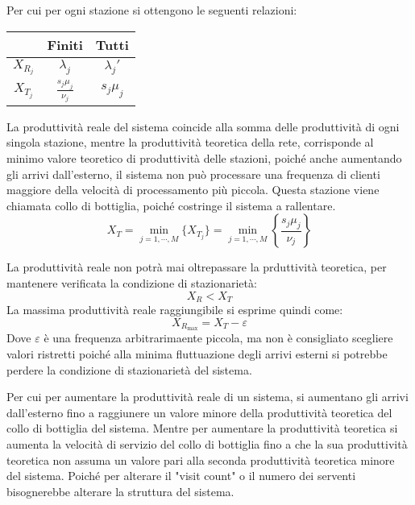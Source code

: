 \documentclass{article}
\numberwithin{equation}{subsection}
\begin{document}
Per cui per ogni stazione si ottengono le seguenti relazioni:
\begin{center}
    \begin{tabular}{c|c|c|}
        & Finiti & Tutti\\
        \hline
        $X_{R_j}$ & $\lambda_j$ & $\lambda_j'$\\
        \hline
        $X_{T_j}$ & $\frac{s_j\mu_j}{\nu_j}$ & $s_j\mu_j$\\
        \hline
    \end{tabular}
\end{center}
La produttività reale del sistema coincide alla somma delle produttività di ogni singola stazione, mentre la produttività teoretica della rete, corrisponde al minimo valore 
teoretico di produttività delle stazioni, poiché anche aumentando gli arrivi dall'esterno, il sistema non può processare una frequenza di clienti maggiore della 
velocità di processamento più piccola. Questa stazione viene chiamata collo di bottiglia, poiché costringe il sistema a rallentare. 
\begin{equation}
    X_T=\min_{j=1,\cdots,M}\{X_{T_j}\}=\min_{j=1,\cdots,M}\left\{\displaystyle\frac{s_j\mu_j}{\nu_j}\right\}
\end{equation}

La produttività reale non potrà mai oltrepassare la prduttività teoretica, per mantenere verificata la condizione di stazionarietà:
\begin{equation*}
    X_R< X_T
\end{equation*}
La massima produttività reale raggiungibile si esprime quindi come:
\begin{equation}
    X_{R_{\max}}=X_T-\varepsilon
\end{equation}
Dove $\varepsilon$ è una frequenza arbitrarimaente piccola, ma non è consigliato scegliere valori ristretti poiché alla minima fluttuazione degli arrivi esterni si potrebbe 
perdere la condizione di stazionarietà del sistema. 

Per cui per aumentare la produttività reale di un sistema, si aumentano gli arrivi dall'esterno fino a raggiunere un valore minore della produttività teoretica del collo di 
bottiglia del sistema. Mentre per aumentare la produttività teoretica si aumenta la velocità di servizio del collo di bottiglia fino a che la sua produttività teoretica non assuma 
un valore pari alla seconda produttività teoretica minore del sistema. Poiché per alterare il "visit count" o il numero dei serventi bisognerebbe alterare la struttura del 
sistema. 
\end{document}
